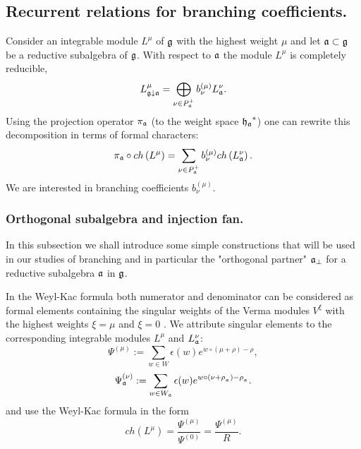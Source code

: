 \subsection{Recurrent relations for branching coefficients.}
\label{sec:recurr-form-branch}

Consider an integrable module $L^{\mu }$
of $\frak{g}$ with the highest weight $\mu $ and
let $\mathfrak{a}\subset \frak{g}$ be a reductive subalgebra of $\frak{g}$.
With respect to $\mathfrak{a}$ the module $L^{\mu }$ is completely reducible,
\begin{equation*}
 L_{\frak{g}\downarrow \mathfrak{a}}^{\mu }=\bigoplus
\limits_{\nu \in P_{\mathfrak{a}}^{+}}b_{\nu }^{\left( \mu \right) }L_{\mathfrak{a}}^{\nu }.
\end{equation*}
Using the projection operator $\pi_{\mathfrak{a}}$ (to the weight space $\frak{h_a}^*$)
one can  rewrite this decomposition in terms of formal characters:
\begin{equation}
\label{branching1}
 \pi _{\mathfrak{a}}\circ ch\left( L^{\mu }\right)
 =\sum_{\nu \in P_{\mathfrak{a}}^{+}}b_{\nu }^{(\mu)}ch\left( L_{\mathfrak{a}}^{\nu }\right) .
\end{equation}
We are interested in branching coefficients $b^{(\mu)}_{\nu}$.

\subsubsection{Orthogonal subalgebra and injection fan.}
\label{subsec:branching-orthog-pair}

In this subsection we shall introduce some simple constructions that will be used
in our studies of branching and in particular the "orthogonal partner" $\mathfrak{a}_{\bot}$ for a
reductive subalgebra $\mathfrak{a}$  in  $\mathfrak{g}$.

In the Weyl-Kac formula both numerator and denominator  can be considered
as formal elements containing the singular weights of the Verma modules $V^{\xi}$
with the highest weights $\xi=\mu$ and $\xi=0$ \cite{humphreys1997introduction}.
We attribute singular elements to the corresponding integrable modules $L^{\mu }$
and $L_{\mathfrak{a}}^{\nu }$:
\begin{equation*}
\Psi ^{\left( \mu \right) }:=\sum\limits_{w\in W}\epsilon (w)e^{w\circ (\mu +\rho )-\rho },
\end{equation*}
\begin{equation*}
\Psi _{ \mathfrak{a}}^{\left( \nu \right) }:=
\sum\limits_{w\in W_{\mathfrak{a}}}\epsilon (w)e^{w\circ (\nu +\rho
_{_{\mathfrak{a}}})-\rho _{_{\mathfrak{a}}}}.
\end{equation*}
and use the Weyl-Kac formula in the form
\begin{equation}
\label{Weyl-Kac2}
ch\left( L^{\mu }\right) =\frac{\Psi ^{\left( \mu \right) }}
{\Psi ^{\left( 0 \right) }}=\frac{\Psi ^{\left( \mu \right) }}{R}.
\end{equation}

